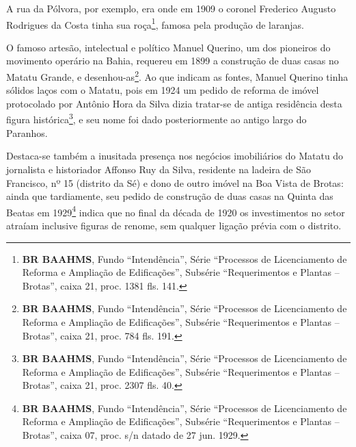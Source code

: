 A rua da Pólvora, por exemplo, era onde em 1909 o coronel Frederico Augusto Rodrigues da Costa tinha sua roça\footnote{\textbf{BR BAAHMS}, Fundo ``Intendência'', Série ``Processos de Licenciamento de Reforma e Ampliação de Edificações'', Subsérie ``Requerimentos e Plantas -- Brotas'', caixa 21, proc. 1381 fls. 141.}, famosa pela produção de laranjas. 














O famoso artesão, intelectual e político Manuel Querino, um dos pioneiros do movimento operário na Bahia, requereu em 1899 a construção de duas casas no Matatu Grande, e desenhou-as\footnote{\textbf{BR BAAHMS}, Fundo ``Intendência'', Série ``Processos de Licenciamento de Reforma e Ampliação de Edificações'', Subsérie ``Requerimentos e Plantas -- Brotas'', caixa 21, proc. 784 fls. 191.}. Ao que indicam as fontes, Manuel Querino tinha sólidos laços com o Matatu, pois em 1924 um pedido de reforma de imóvel protocolado por Antônio Hora da Silva dizia tratar-se de antiga residência desta figura histórica\footnote{\textbf{BR BAAHMS}, Fundo ``Intendência'', Série ``Processos de Licenciamento de Reforma e Ampliação de Edificações'', Subsérie ``Requerimentos e Plantas -- Brotas'', caixa 21, proc. 2307 fls. 40.}, e seu nome foi dado posteriormente ao antigo largo do Paranhos.

Destaca-se também a inusitada presença nos negócios imobiliários do Matatu do jornalista e historiador Affonso Ruy da Silva, residente na ladeira de São Francisco, nº 15 (distrito da Sé) e dono de outro imóvel na Boa Vista de Brotas: ainda que tardiamente, seu pedido de construção de duas casas na Quinta das Beatas em 1929\footnote{\textbf{BR BAAHMS}, Fundo ``Intendência'', Série ``Processos de Licenciamento de Reforma e Ampliação de Edificações'', Subsérie ``Requerimentos e Plantas -- Brotas'', caixa 07, proc.  s/n datado de 27 jun. 1929.} indica que no final da década de 1920 os investimentos no setor atraíam inclusive figuras de renome, sem qualquer ligação prévia com o distrito.

